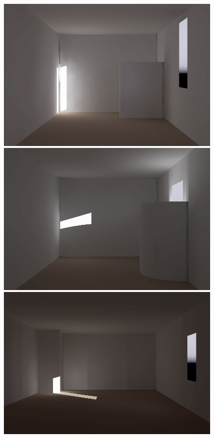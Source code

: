 \begin{figure}[t]
\includegraphics[width=\figwidth]{p3r_PRE_N2_dec_dark.png}
\includegraphics[width=\figwidth]{p3r_N2_dec_dark.png} \hfill
\includegraphics[width=\figwidth]{p3r_PRE_N6_dec_dark.png}

\end{figure}
